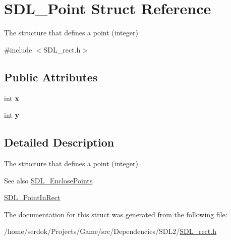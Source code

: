 \hypertarget{structSDL__Point}{}\section{S\+D\+L\+\_\+\+Point Struct Reference}
\label{structSDL__Point}


The structure that defines a point (integer)  




{\ttfamily \#include $<$S\+D\+L\+\_\+rect.\+h$>$}

\subsection*{Public Attributes}
\begin{DoxyCompactItemize}
\item 
\mbox{\label{structSDL__Point_a2ee987d59888024771c8d83aec43056c}} 
int {\bfseries x}
\item 
\mbox{\label{structSDL__Point_aaa68aefa869f6bdf46367a70bd9414b0}} 
int {\bfseries y}
\end{DoxyCompactItemize}


\subsection{Detailed Description}
The structure that defines a point (integer) 

\begin{DoxySeeAlso}{See also}
\hyperlink{SDL__rect_8h_afcbb58dbba760b9e6fdb4b5d1ece015c}{S\+D\+L\+\_\+\+Enclose\+Points} 

\hyperlink{SDL__rect_8h_a2f9708f2739ef234c34e6feda50b4d2c}{S\+D\+L\+\_\+\+Point\+In\+Rect} 
\end{DoxySeeAlso}


The documentation for this struct was generated from the following file\+:\begin{DoxyCompactItemize}
\item 
/home/serdok/\+Projects/\+Game/src/\+Dependencies/\+S\+D\+L2/\hyperlink{SDL__rect_8h}{S\+D\+L\+\_\+rect.\+h}\end{DoxyCompactItemize}
